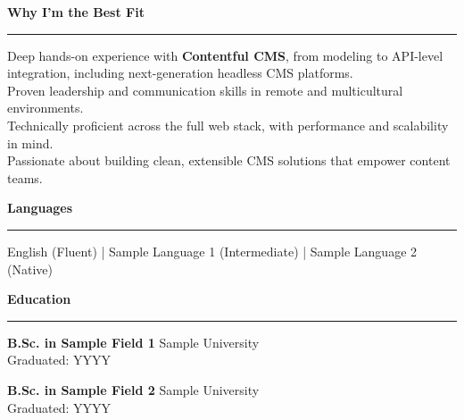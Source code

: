 \documentclass[a4paper,10pt]{article}
\newcommand{\sectiontitle}[1]{\vspace{6pt}\noindent\textbf{\large #1}\vspace{3pt}\hrule\vspace{6pt}}
\begin{document}
	\sectiontitle{Why I’m the Best Fit}
	Deep hands-on experience with \textbf{Contentful CMS}, from modeling to API-level integration, including next-generation headless CMS platforms. \\
	Proven leadership and communication skills in remote and multicultural environments. \\
	Technically proficient across the full web stack, with performance and scalability in mind. \\
	Passionate about building clean, extensible CMS solutions that empower content teams.
	
	\sectiontitle{Languages}
	English (Fluent) \quad | \quad Sample Language 1 (Intermediate) \quad | \quad Sample Language 2 (Native)
	
	\sectiontitle{Education}
	
	\textbf{B.Sc. in Sample Field 1} \hfill Sample University \\
	Graduated: YYYY
	
	\textbf{B.Sc. in Sample Field 2} \hfill Sample University \\
	Graduated: YYYY
	
\end{document}
